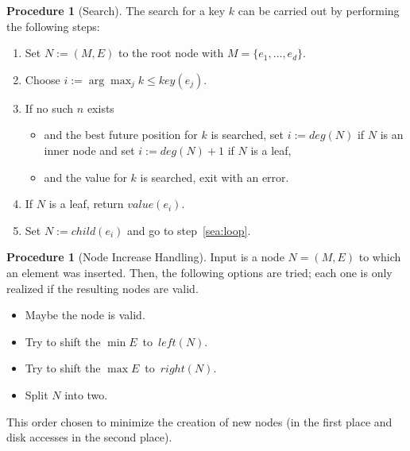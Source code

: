 \documentclass[a4paper, 8pt, twoclumn]{scrartcl}
\theoremstyle{plain}
\theoremstyle{definition}
\newtheorem{proc}[thm]{Procedure}
\theoremstyle{remark}
\begin{document}
\begin{multicols}{2}
\begin{proc}[Search] \label{sea}
The search for a key $k$ can be carried out by performing the following steps:
\begin{enumerate}
\item Set \mbox{$N := (M, E)$} to the root node with
	\mbox{$M = \{e_1, \ldots, e_d\}$}.
\item \label{sea:loop} Choose \mbox{$i := \arg \max_{j} k \leq key(e_j)$}.
\item If no such $n$ exists
	\begin{itemize}
	\item and the best future position for $k$ is searched,
		set \mbox{$i := deg(N)$} if $N$ is an inner node and
		set \mbox{$i := deg(N) + 1$} if $N$ is a leaf,
	\item and the value for $k$ is searched, exit with an error.
	\end{itemize}
\item If $N$ is a leaf, return $value(e_i)$.
\item Set \mbox{$N := child(e_i)$} and go to step~\ref{sea:loop}.
\end{enumerate}
\end{proc}


\begin{proc}[Node Increase Handling] \label{inc}
Input is a node \mbox{$N = (M, E)$} to which an element was inserted.
Then, the following options are tried; each one is only realized if the 
resulting nodes are valid.
\begin{itemize}
\item[1:] Maybe the node is valid.
\item[2:] Try to shift the \mbox{$\min E$ to $left(N)$}.
\item[3:] Try to shift the \mbox{$\max E$ to $right(N)$}.
\item[4:] Split $N$ into two.
\end{itemize}
This order chosen to minimize the creation of new nodes (in the first place and
disk accesses in the second place).


\end{proc}
\end{multicols}
\end{document}
